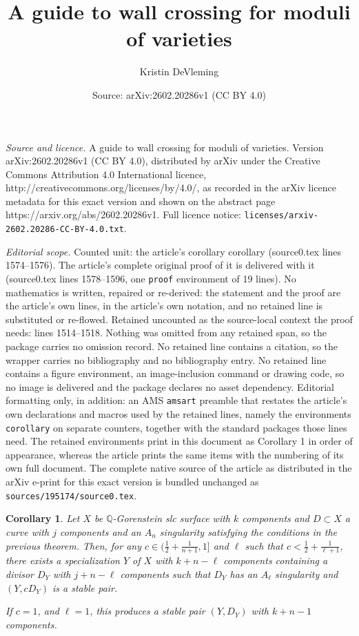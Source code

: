 \documentclass[10pt,a4paper]{amsart}
\title{A guide to wall crossing for moduli of varieties}
\author{Kristin DeVleming}
\date{Source: arXiv:2602.20286v1 (CC BY 4.0)}
\newtheorem{corollary}{Corollary}
\newcommand{\bQ}{\mathbb{Q}}
\begin{document}
\maketitle

\noindent\emph{Source and licence.} A guide to wall crossing for moduli of varieties. Version arXiv:2602.20286v1 (CC BY 4.0), distributed by arXiv under the Creative Commons Attribution 4.0 International licence, http://creativecommons.org/licenses/by/4.0/, as recorded in the arXiv licence metadata for this exact version and shown on the abstract page https://arxiv.org/abs/2602.20286v1. Full licence notice: \texttt{licenses/arxiv-2602.20286-CC-BY-4.0.txt}.\par\smallskip

\noindent\textit{Editorial scope.} Counted unit: the article's corollary corollary (source0.tex lines 1574--1576). The article's complete original proof of it is delivered with it (source0.tex lines 1578--1596, one \texttt{proof} environment of 19 lines). No mathematics is written, repaired or re-derived: the statement and the proof are the article's own lines, in the article's own notation, and no retained line is substituted or re-flowed.  Retained uncounted as the source-local context the proof needs: lines 1514--1518.  Nothing was omitted from any retained span, so the package carries no omission record.  No retained line contains a citation, so the wrapper carries no bibliography and no bibliography entry.  No retained line contains a figure environment, an image-inclusion command or drawing code, so no image is delivered and the package declares no asset dependency.  Editorial formatting only, in addition: an AMS \texttt{amsart} preamble that restates the article's own declarations and macros used by the retained lines, namely the environments \texttt{corollary} on separate counters, together with the standard packages those lines need.  The retained environments print in this document as Corollary 1 in order of appearance, whereas the article prints the same items with the numbering of its own full document.  The complete native source of the article as distributed in the arXiv e-print for this exact version is bundled unchanged as \texttt{sources/195174/source0.tex}.
\begin{corollary}\label{cor:manycomps}
    Let $X$ be $\bQ$-Gorenstein slc surface with $k$ components and $D \subset X$ a curve with $j$ components and an $A_n$ singularity satisfying the conditions in the previous theorem.  Then, for any $c \in (\frac{1}{2} + \frac{1}{n+1}, 1]$ and $\ell$ such that $c <\frac{1}{2} + \frac{1}{\ell+1}$, there exists a specialization $Y$ of $X$ with $k+n -\ell$ components containing a divisor $D_Y$ with $j + n - \ell$ components such that $D_Y$ has an $A_\ell$ singularity and $(Y, c D_Y)$ is a stable pair.

    If $c = 1$, and $\ell = 1$, this produces a stable pair $(Y,D_Y)$ with $k+n -1$ components. 
\end{corollary}
\end{document}
